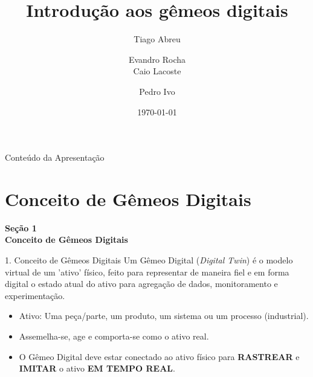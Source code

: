 \documentclass[aspectratio=169,xcolor=dvipsnames]{beamer}
\title{Introdução aos gêmeos digitais}
\author{%
Tiago Abreu \and Evandro Rocha  \\%
Caio Lacoste \and Pedro Ivo %
}
\date{\today}
\institute{Laboratório de Processamento de Sinais (LPS)}
\begin{document}
\begin{frame}[plain]
    \titlepage
\end{frame}

\begin{frame}{Conteúdo da Apresentação}
    \tableofcontents
\end{frame}

\section{Conceito de Gêmeos Digitais}

\begin{frame}[plain]
    \vfill
    \centering
    {\Large\textcolor{dexpiBlue}{\textbf{Seção 1}}}\\[0.8em]
    {\LARGE\textbf{Conceito de Gêmeos Digitais}}\\[0.6em]
    \vfill
\end{frame}

\begin{frame}{1. Conceito de Gêmeos Digitais}
Um Gêmeo Digital (\textit{Digital Twin}) é o modelo virtual de um 'ativo' físico, feito para representar de maneira fiel e em forma digital o estado atual do ativo para agregação de dados, monitoramento e experimentação.
\begin{itemize}
    \item Ativo: Uma peça/parte, um produto, um sistema ou um processo (industrial).
    \item Assemelha-se, age e comporta-se como o ativo real.
    \item O Gêmeo Digital deve estar conectado ao ativo físico para \textbf{RASTREAR} e \textbf{IMITAR} o ativo \textbf{EM TEMPO REAL}.
\end{itemize}
    
\end{frame}
\end{document}

